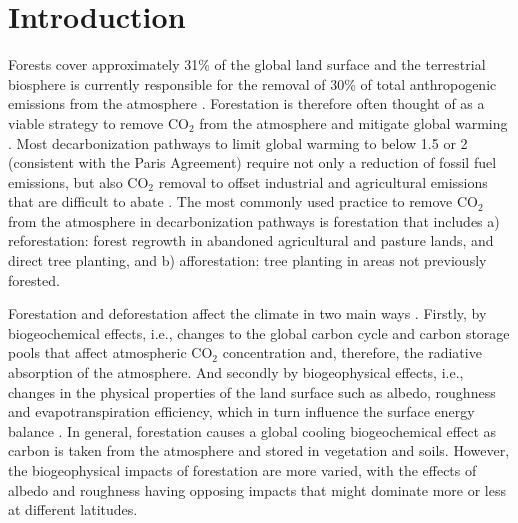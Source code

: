 \documentclass[draft]{agujournal2019}
\begin{document}

\section{Introduction}


Forests cover approximately 31\% of the global land surface \cite{luyssaert_land_2014,fao_global_2020} and the terrestrial biosphere is currently responsible for the removal of 30\% of total anthropogenic emissions from the atmosphere \cite{friedlingstein_global_2022}.
Forestation is therefore often thought of as a viable strategy to remove CO$_2$ from the atmosphere and mitigate global warming \cite{house_maximum_2002, griscom_natural_2017, smith_long-term_2022}.
Most decarbonization pathways to limit global warming to below 1.5 or 2 \textcelsius{} (consistent with the Paris Agreement) require not only a reduction of fossil fuel emissions, but also CO$_2$ removal to offset industrial and agricultural emissions that are difficult to abate \cite{babiker_crosssectoral_2022}.
The most commonly used practice to remove CO$_2$ from the atmosphere in decarbonization pathways is forestation that includes a) reforestation: forest regrowth in abandoned agricultural and pasture lands, and direct tree planting, and b) afforestation: tree planting in areas not previously forested.

Forestation and deforestation affect the climate in two main ways \cite{pongratz_biogeophysical_2010,ito_biogeophysical_2020,zhu_comparable_2023}.
Firstly, by biogeochemical effects, i.e., changes to the global carbon cycle and carbon storage pools that affect atmospheric CO$_2$ concentration and, therefore, the radiative absorption of the atmosphere.
And secondly by biogeophysical effects, i.e., changes in the physical properties of the land surface such as albedo, roughness and evapotranspiration efficiency, which in turn influence the surface energy balance \cite{betts_offset_2000,bala_combined_2007,winckler_importance_2019}.
In general, forestation causes a global cooling biogeochemical effect as carbon is taken from the atmosphere and stored in vegetation and soils.
However, the biogeophysical impacts of forestation are more varied, with the effects of albedo and roughness having opposing impacts that might dominate more or less at different latitudes.
\end{document}
